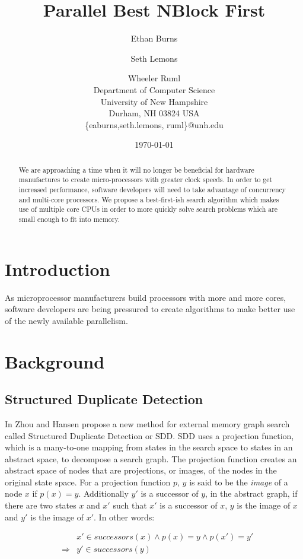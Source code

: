 \documentclass{article} \usepackage{aaai} \usepackage{graphicx}
\title{Parallel Best NBlock First}
\author{Ethan Burns \and Seth Lemons \and Wheeler Ruml \\
Department of Computer Science \\
University of New Hampshire \\
Durham, NH 03824 USA \\
\{eaburns,seth.lemons, ruml\}@unh.edu}
\date{\today}
\begin{document}
\maketitle

\begin{abstract}
We are approaching a time when it will no longer be beneficial for
hardware manufactures to create micro-processors with greater clock
speeds.  In order to get increased performance, software developers
will need to take advantage of concurrency and multi-core processors.
We propose a best-first-ish search algorithm which makes use of
multiple core CPUs in order to more quickly solve search problems
which are small enough to fit into memory.
\end{abstract}

\section{Introduction}

As microprocessor manufacturers build processors with more and more
cores, software developers are being pressured to create algorithms to
make better use of the newly available parallelism.

\section{Background}

\subsection{Structured Duplicate Detection}

In \cite{zhou:sdd} Zhou and Hansen propose a new method for external
memory graph search called Structured Duplicate Detection or SDD.  SDD
uses a projection function, which is a many-to-one mapping from states
in the search space to states in an abstract space, to decompose a
search graph.  The projection function creates an abstract space of
nodes that are projections, or images, of the nodes in the original
state space.  For a projection function $p$, $y$ is said to be the
\emph{image} of a node $x$ if $p(x) = y$.  Additionally $y'$ is a
successor of $y$, in the abstract graph, if there are two states $x$
and $x'$ such that $x'$ is a successor of $x$, $y$ is the image of $x$
and $y'$ is the image of $x'$.  In other words:

\begin{eqnarray*}
&&x' \in successors(x) \wedge p(x) = y \wedge p(x') = y' \\
&\Rightarrow& y' \in successors(y)
\end{eqnarray*}
\end{document}
